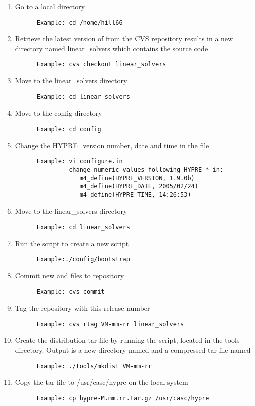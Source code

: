 \begin{enumerate}
\item Go to a local directory
\begin{verbatim}
      Example: cd /home/hill66
\end{verbatim}
\item Retrieve the latest version of \hypre{} from the CVS repository
      results in a new directory named linear\_solvers which contains the source code
\begin{verbatim}
      Example: cvs checkout linear_solvers
\end{verbatim}
\item Move to the linear\_solvers directory
\begin{verbatim}
      Example: cd linear_solvers
\end{verbatim}
\item Move to the config directory
\begin{verbatim}
      Example: cd config
\end{verbatim}
\item Change the HYPRE\_version number, date and time in the  file
\begin{verbatim}
      Example: vi configure.in
               change numeric values following HYPRE_* in:
                  m4_define(HYPRE_VERSION, 1.9.0b)
                  m4_define(HYPRE_DATE, 2005/02/24)
                  m4_define(HYPRE_TIME, 14:26:53)
\end{verbatim}
\item Move to the linear\_solvers directory
\begin{verbatim}
      Example: cd linear_solvers
\end{verbatim}
\item Run the  script to create a new  script
\begin{verbatim}
      Example:./config/bootstrap
\end{verbatim}
\item Commit new  and  files to repository
\begin{verbatim}
      Example: cvs commit 
\end{verbatim}
\item Tag the repository with this release number
\begin{verbatim}
      Example: cvs rtag VM-mm-rr linear_solvers
\end{verbatim}
\item Create the distribution tar file by running the  script,
      located in the tools directory. Output is a new directory named 
      and a compressed tar file named 
\begin{verbatim}
      Example: ./tools/mkdist VM-mm-rr
\end{verbatim}
\item Copy the tar file to /usr/casc/hypre on the local system
\begin{verbatim}
      Example: cp hypre-M.mm.rr.tar.gz /usr/casc/hypre
\end{verbatim}
\end{enumerate}

